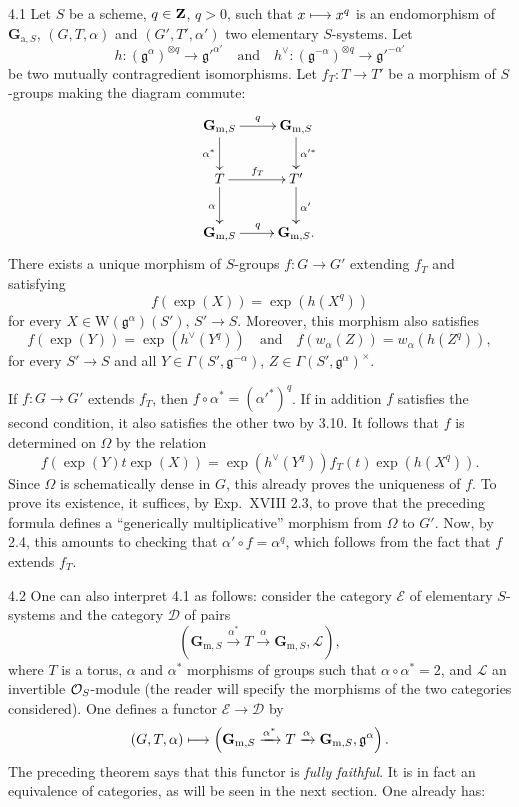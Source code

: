 \label{XX.sec.4}
\begin{theorem}{4.1}\label{XX.4.1}
Let $S$ be a scheme, $q\in\mathbf{Z}$, $q>0$, such that $x\longmapsto x^q$ is an endomorphism of $\mathbf G_{\mathrm a,S}$, $(G,T,\alpha)$ and $(G',T',\alpha')$ two elementary $S$-systems. Let
\[
h:(\mathfrak g^\alpha)^{\otimes q}\to\mathfrak g'^{\alpha'}\quad\text{and}\quad
h^\vee:(\mathfrak g^{-\alpha})^{\otimes q}\to\mathfrak g'^{-\alpha'}
\]
be two mutually contragredient isomorphisms. Let $f_T:T\to T'$ be a morphism of $S$-groups making the diagram commute:
\[
\xymatrix{
\mathbf G_{\mathrm m,S}\ar[r]^q\ar[d]_{\alpha^*}&\mathbf G_{\mathrm m,S}\ar[d]^{\alpha'^*}\\
T\ar[r]^{f_T}\ar[d]_\alpha&T'\ar[d]^{\alpha'}\\
\mathbf G_{\mathrm m,S}\ar[r]^q&\mathbf G_{\mathrm m,S}.
}
\]
There exists a unique morphism of $S$-groups $f:G\to G'$ extending $f_T$ and satisfying
\[
f(\exp(X))=\exp(h(X^q))
\]
for every $X\in\mathrm W(\mathfrak g^\alpha)(S')$, $S'\to S$. Moreover, this morphism also satisfies
\[
f(\exp(Y))=\exp(h^\vee(Y^q))\quad\text{and}\quad f(w_\alpha(Z))=w_\alpha(h(Z^q)),
\]
for every $S'\to S$ and all $Y\in\Gamma(S',\mathfrak g^{-\alpha})$, $Z\in\Gamma(S',\mathfrak g^\alpha)^\times$.
\end{theorem}
If $f:G\to G'$ extends $f_T$, then $f\circ\alpha^*=(\alpha'^*)^q$. If in addition $f$ satisfies the second condition, it also satisfies the other two by 3.10. It follows that $f$ is determined on $\Omega$ by the relation
\[
f(\exp(Y)t\exp(X))=\exp(h^\vee(Y^q))f_T(t)\exp(h(X^q)).
\]
Since $\Omega$ is schematically dense in $G$, this already proves the uniqueness of $f$. To prove its existence, it suffices, by Exp.~XVIII 2.3, to prove that the preceding formula defines a ``generically multiplicative'' morphism from $\Omega$ to $G'$. Now, by 2.4, this amounts to checking that $\alpha'\circ f=\alpha^q$, which follows from the fact that $f$ extends $f_T$.

\begin{scholium}{4.2}\label{XX.4.2}
One can also interpret 4.1 as follows: consider the category $\mathcal E$ of elementary $S$-systems and the category $\mathcal D$ of pairs
\[
\left(\mathbf G_{\mathrm m,S}\xrightarrow{\alpha^*}T\xrightarrow\alpha\mathbf G_{\mathrm m,S},\mathcal L\right),
\]
where $T$ is a torus, $\alpha$ and $\alpha^*$ morphisms of groups such that $\alpha\circ\alpha^*=2$, and $\mathcal L$ an invertible $\mathcal{O}_S$-module (the reader will specify the morphisms of the two categories considered). One defines a functor $\mathcal E\to\mathcal D$ by
\[
(G,T,\alpha)\longmapsto\left(\mathbf G_{\mathrm m,S}\xrightarrow{\alpha^*}T\xrightarrow\alpha\mathbf G_{\mathrm m,S},\mathfrak g^\alpha\right).
\]
The preceding theorem says that this functor is \emph{fully faithful}. It is in fact an equivalence of categories, as will be seen in the next section. One already has:
\end{scholium}


